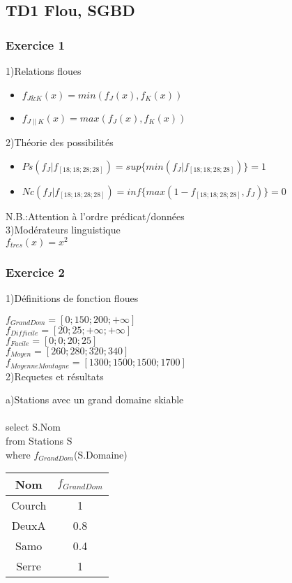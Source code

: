 \documentclass[a4paper,11pt]{article}
\begin{document}
\subsection{TD1 Flou, SGBD}
\subsubsection{Exercice 1}
1)Relations floues
\begin{itemize}
\item $f_{J\&K}(x)=min(f_J(x),f_K(x))$
\item $f_{J\|K}(x)=max(f_J(x),f_K(x))$
\end{itemize}

2)Théorie des possibilités
\begin{itemize}
\item $Ps(f_J|f_{[18;18;28;28]})=sup\{min(f_J|f_{[18;18;28;28]})\}=1$
\item $Nc(f_J|f_{[18;18;28;28]})=inf\{max(1-f_{[18;18;28;28]},f_J)\}=0$
\end{itemize}
N.B.:Attention à l'ordre prédicat/données\\

3)Modérateurs linguistique\\
$f_{tres}(x)=x^2 $
\subsubsection{Exercice 2}

1)Définitions de fonction floues

$f_{GrandDom}=[0;150;200;+\infty]$\\
$f_{Difficile}=[20;25;+\infty;+\infty]$\\
$f_{Facile}=[0;0;20;25]$\\
$f_{Moyen}=[260;280;320;340]$\\
$f_{MoyenneMontagne}=[1300;1500;1500;1700]$\\

2)Requetes et résultats

a)Stations avec un grand domaine skiable\\\\
select S.Nom\\ 
from Stations S\\
where $f_{GrandDom}$(S.Domaine)\\

\begin{tabular}{|c|c|}
\hline 
Nom & $f_{GrandDom}$ \\ 
\hline 
Courch & 1 \\ 
\hline 
DeuxA & 0.8 \\ 
\hline 
Samo & 0.4 \\ 
\hline 
Serre & 1 \\ 
\hline 
\end{tabular} \\\\
\end{document}
